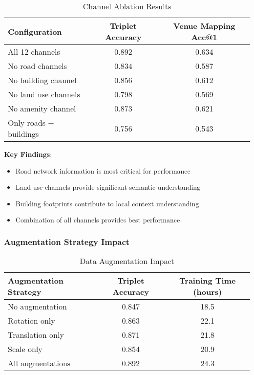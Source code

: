 \begin{table}[H]
\centering
\caption{Channel Ablation Results}
\begin{tabular}{|l|c|c|}
\hline
\textbf{Configuration} & \textbf{Triplet Accuracy} & \textbf{Venue Mapping Acc@1} \\
\hline
All 12 channels & 0.892 & 0.634 \\
No road channels & 0.834 & 0.587 \\
No building channel & 0.856 & 0.612 \\
No land use channels & 0.798 & 0.569 \\
No amenity channel & 0.873 & 0.621 \\
Only roads + buildings & 0.756 & 0.543 \\
\hline
\end{tabular}
\end{table}

\textbf{Key Findings}:
\begin{itemize}
    \item Road network information is most critical for performance
    \item Land use channels provide significant semantic understanding
    \item Building footprints contribute to local context understanding
    \item Combination of all channels provides best performance
\end{itemize}

\subsubsection{Augmentation Strategy Impact}

\begin{table}[H]
\centering
\caption{Data Augmentation Impact}
\begin{tabular}{|l|c|c|}
\hline
\textbf{Augmentation Strategy} & \textbf{Triplet Accuracy} & \textbf{Training Time (hours)} \\
\hline
No augmentation & 0.847 & 18.5 \\
Rotation only & 0.863 & 22.1 \\
Translation only & 0.871 & 21.8 \\
Scale only & 0.854 & 20.9 \\
All augmentations & 0.892 & 24.3 \\
\hline
\end{tabular}
\end{table}

